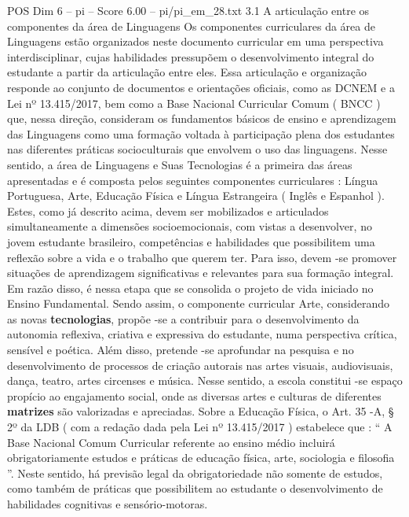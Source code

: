 \begin{textsample}{POS Dim 6 – pi – Score 6.00 – pi/pi\_em\_28.txt}  \label{ex:f6_pos_198}
3.1 A articulação entre os componentes da área de Linguagens Os componentes curriculares da área de Linguagens estão organizados neste documento curricular em uma perspectiva interdisciplinar, cujas habilidades pressupõem o desenvolvimento integral do estudante a partir da articulação entre eles.
Essa articulação e organização responde ao conjunto de documentos e orientações oficiais, como as DCNEM e a Lei nº 13.415/2017, bem como a Base Nacional Curricular Comum ( BNCC ) que, nessa direção, consideram os fundamentos básicos de ensino e aprendizagem das Linguagens como uma formação voltada à participação plena dos estudantes nas diferentes práticas socioculturais que envolvem o uso das linguagens.
Nesse sentido, a área de Linguagens e Suas Tecnologias é a primeira das áreas apresentadas e é composta pelos seguintes componentes curriculares : Língua Portuguesa, Arte, Educação Física e Língua Estrangeira ( Inglês e Espanhol ).
Estes, como já descrito acima, devem ser mobilizados e articulados simultaneamente a dimensões socioemocionais, com vistas a desenvolver, no jovem estudante brasileiro, competências e habilidades que possibilitem uma reflexão sobre a vida e o trabalho que querem ter.
Para isso, devem -se promover situações de aprendizagem significativas e relevantes para sua formação integral.
Em razão disso, é nessa etapa que se consolida o projeto de vida iniciado no Ensino Fundamental.
Sendo assim, o componente curricular Arte, considerando as novas \textbf{tecnologias}, propõe -se a contribuir para o desenvolvimento da autonomia reflexiva, criativa e expressiva do estudante, numa perspectiva crítica, sensível e poética.
Além disso, pretende -se aprofundar na pesquisa e no desenvolvimento de processos de criação autorais nas artes visuais, audiovisuais, dança, teatro, artes circenses e música.
Nesse sentido, a escola constitui -se espaço propício ao engajamento social, onde as diversas artes e culturas de diferentes \textbf{matrizes} são valorizadas e apreciadas.
Sobre a Educação Física, o Art. 35 -A, § 2º da LDB ( com a redação dada pela Lei nº 13.415/2017 ) estabelece que : “ A Base Nacional Comum Curricular referente ao ensino médio incluirá obrigatoriamente estudos e práticas de educação física, arte, sociologia e filosofia ”.
Neste sentido, há previsão legal da obrigatoriedade não somente de estudos, como também de práticas que possibilitem ao estudante o desenvolvimento de habilidades cognitivas e sensório-motoras.

\end{textsample}
